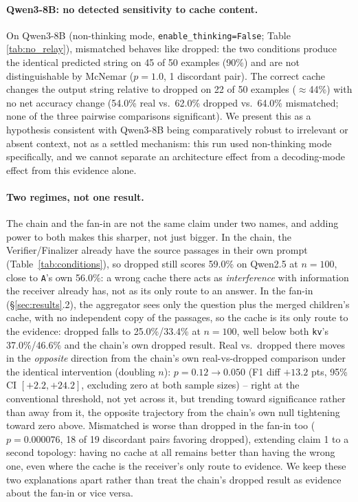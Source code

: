 \documentclass[11pt]{article}
\begin{document}
\paragraph{Qwen3-8B: no detected sensitivity to cache content.} On
Qwen3-8B (non-thinking mode, \texttt{enable\_thinking=False}; Table
\ref{tab:no_relay}), mismatched behaves like dropped: the two
conditions produce the identical predicted string on 45 of 50 examples
(90\%) and are not distinguishable by McNemar ($p=1.0$, 1 discordant
pair). The correct cache changes the output string relative to dropped
on 22 of 50 examples ($\approx$44\%) with no net accuracy change
(54.0\% real vs.\ 62.0\% dropped vs.\ 64.0\% mismatched; none of the
three pairwise comparisons significant). We present this as a
hypothesis consistent with Qwen3-8B being comparatively robust to
irrelevant or absent context, not as a settled mechanism: this run used
non-thinking mode specifically, and we cannot separate an architecture
effect from a decoding-mode effect from this evidence alone.

\paragraph{Two regimes, not one result.} The chain and the fan-in are
not the same claim under two names, and adding power to both makes this
sharper, not just bigger. In the chain, the Verifier/Finalizer already
have the source passages in their own prompt (Table~\ref{tab:conditions}),
so dropped still scores 59.0\% on Qwen2.5 at $n=100$, close to
\texttt{A}'s own 56.0\%: a wrong cache there acts as \emph{interference}
with information the receiver already has, not as its only route to an
answer. In the fan-in (\S\ref{sec:results}.2), the aggregator sees only
the question plus the merged children's cache, with no independent copy
of the passages, so the cache is its only route to the evidence: dropped
falls to 25.0\%/33.4\% at $n=100$, well below both \texttt{kv}'s
37.0\%/46.6\% and the chain's own dropped result. Real vs.\ dropped
there moves in the \emph{opposite} direction from the chain's own
real-vs-dropped comparison under the identical intervention (doubling
$n$): $p=0.12\to0.050$ (F1 diff $+13.2$ pts, 95\% CI $[+2.2,+24.2]$,
excluding zero at both sample sizes) -- right at the conventional
threshold, not yet across it, but trending toward significance rather
than away from it, the opposite trajectory from the chain's own null
tightening toward zero above. Mismatched is worse than dropped in the
fan-in too ($p=0.000076$, 18 of 19 discordant pairs favoring dropped),
extending claim 1 to a second topology: having no cache at all remains
better than having the wrong one, even where the cache is the
receiver's only route to evidence. We keep these two explanations apart
rather than treat the chain's dropped result as evidence about the
fan-in or vice versa.
\end{document}
